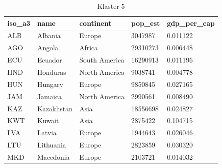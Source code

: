 \documentclass[11pt]{report}
\begin{document}
    \begin{table}[]
        \caption {Klaster 5} \label{tab:cl5}
        \begin{tabular}{lllll}
            \hline
            \multicolumn{1}{|l|}{iso\_a3} & \multicolumn{1}{l|}{name} & \multicolumn{1}{l|}{continent} & \multicolumn{1}{l|}{pop\_est} & \multicolumn{1}{l|}{gdp\_per\_cap} \\ \hline
            ALB                           & Albania                   & Europe                         & 3047987                       & 0.011122                           \\
            AGO                           & Angola                    & Africa                         & 29310273                      & 0.006448                           \\
            ECU                           & Ecuador                   & South America                  & 16290913                      & 0.011196                           \\
            HND                           & Honduras                  & North America                  & 9038741                       & 0.004778                           \\
            HUN                           & Hungary                   & Europe                         & 9850845                       & 0.027165                           \\
            JAM                           & Jamaica                   & North America                  & 2990561                       & 0.008490                           \\
            KAZ                           & Kazakhstan                & Asia                           & 18556698                      & 0.024827                           \\
            KWT                           & Kuwait                    & Asia                           & 2875422                       & 0.104715                           \\
            LVA                           & Latvia                    & Europe                         & 1944643                       & 0.026046                           \\
            LTU                           & Lithuania                 & Europe                         & 2823859                       & 0.030320                           \\
            MKD                           & Macedonia                 & Europe                         & 2103721                       & 0.014032                           \\

\end{tabular}
\end{table}
\end{document}

